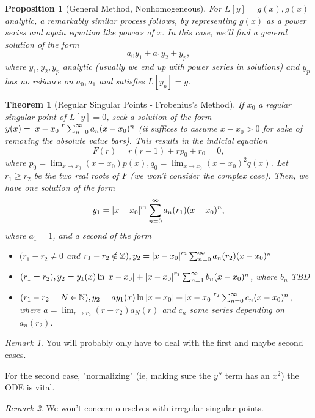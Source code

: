 \documentclass[12pt, oneside]{article}
\theoremstyle{definition}
\theoremstyle{plain}
\newtheorem{thm}{Theorem}
\newtheorem{prop}{Proposition}
\theoremstyle{remark}
\newtheorem{remark}{Remark}
\begin{document}
\begin{prop}[General Method, Nonhomogeneous]
  For $L[y] = g(x), g(x)$ analytic, a remarkably similar process follows, by representing $g(x)$ as a power series and again equation like powers of $x$. In this case, we'll find a general solution of the form \[
  a_0 y_1 + a_1 y_2 + y_p,  
  \]
  where $y_1, y_2, y_p$ analytic (usually we end up with power series in solutions) and $y_p$ has no reliance on $a_0, a_1$ and satisfies $L[y_p] = g$.
\end{prop}

\begin{thm}[Regular Singular Points - Frobenius's Method]
  If $x_0$ a regular singular point of $L[y] = 0$, seek a solution of the form $y(x) = \abs{x - x_0}^r \sum_{n=0}^\infty a_n (x - x_0)^n$ (it suffices to assume $x - x_0 > 0$ for sake of removing the absolute value bars). This results in the indicial equation \[
  F(r) = r(r - 1) + rp_0 + r_0 = 0,  
  \]
  where $p_0 = \lim_{x \to x_0} (x - x_0)p(x), q_0 = \lim_{x \to x_0} (x-x_0)^2 q(x)$. Let $r_1\geq r_2$ be the two real roots of $F$ (we won't consider the complex case). Then, we have one solution of the form \[
  y_1 = \abs{x -x_0}^{r_1}\sum_{n=0}^\infty a_n(r_1)(x - x_0)^n,  
  \] where $a_1 = 1$, and a second of the form \begin{itemize}
    \item $(r_1 - r_2 \neq 0$ and $r_1 - r_2 \notin \mathbb{Z}), y_2 =  \abs{x -x_0}^{r_2}\sum_{n=0}^\infty a_n(r_2)(x - x_0)^n$
    \item $(r_1 = r_2), y_2 = y_1(x) \ln \abs{x - x_0} + \abs{x - x_0}^{r_1} \sum_{n=1}^\infty b_n (x - x_0)^n$, where $b_n$ TBD
    \item $(r_1 - r_2 = N \in \mathbb{N}), y_2 = a y_1(x) \ln \abs{x - x_0} + \abs{x - x_0}^{r_2}\sum_{n=0}^\infty c_n ( x - x_0)^n$, where $a = \lim_{r \to r_2} (r - r_2) a_N(r)$ and $c_n$ some series depending on $a_n(r_2)$.
  \end{itemize}
\end{thm}

\begin{remark}
  You will probably only have to deal with the first and maybe second cases.

  For the second case, "normalizing" (ie, making sure the $y''$ term has an $x^2$) the ODE is vital.
\end{remark}

\begin{remark}
We won't concern ourselves with irregular singular points.  
\end{remark}
\end{document}
